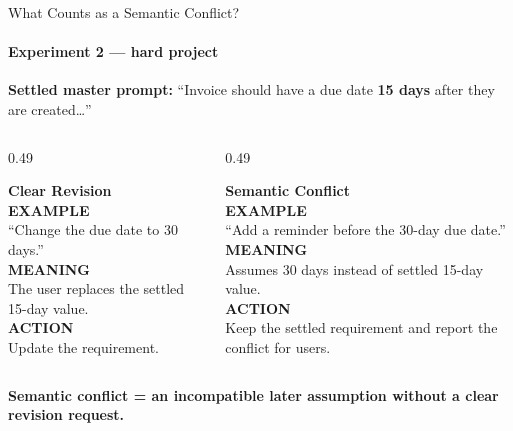 \documentclass[aspectratio=169,11pt,c]{beamer}
\newcommand{\calllbl}[1]{{\footnotesize\bfseries\color{primaryblue}\MakeUppercase{#1}}\\[2pt]}
\begin{document}
\begin{frame}{What Counts as a Semantic Conflict?}
  \framesubtitle{Experiment 2 --- hard project}
  {\footnotesize\color{midgray}\textbf{Settled master prompt:} ``Invoice should have a due date \textbf{15 days} after they are created\dots''\par}
  \vspace{2pt}
  \begin{columns}[T]
    \begin{column}{0.49\textwidth}
      \begin{goodpanel}
        \textbf{\color{primaryblue}Clear Revision}\\[1pt]
        \calllbl{Example} ``Change the due date to 30 days.''\\[1pt]
        \calllbl{Meaning} The user replaces the settled 15-day value.\\[1pt]
        \calllbl{Action} Update the requirement.
      \end{goodpanel}
    \end{column}
    \begin{column}{0.49\textwidth}
      \begin{flagpanel}
        \textbf{\color{accentorange}Semantic Conflict}\\[1pt]
        \calllbl{Example} ``Add a reminder before the 30-day due date.''\\[1pt]
        \calllbl{Meaning} Assumes 30 days instead of settled 15-day value.\\[1pt]
        \calllbl{Action} Keep the settled requirement and report the conflict for users.
      \end{flagpanel}
    \end{column}
  \end{columns}
  \vspace{3pt}
  {\footnotesize\bfseries\color{accentorange}\centering Semantic conflict = an incompatible later assumption without a clear revision request.\par}
\end{frame}
\end{document}
